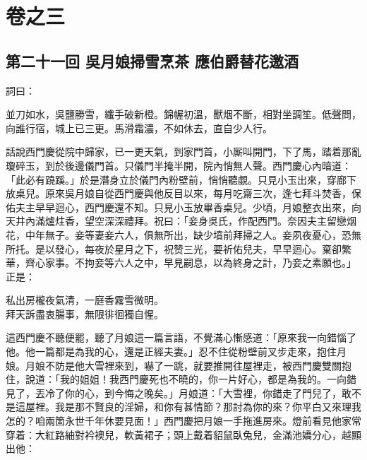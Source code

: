 \part*{{\titlename}卷之三}



\chapter*{第二十一回 吳月娘掃雪烹茶 應伯爵替花邀酒}


詞曰：

\begin{myquote} 
並刀如水，吳鹽勝雪，纖手破新橙。錦幄初溫，獸烟不斷，相對坐調笙。低聲問，向誰行宿，城上已三更。馬滑霜濃，不如休去，直自少人行。

\end{myquote} 

話說西門慶從院中歸家，已一更天氣，到家門首，小厮叫開門，下了馬，踏着那亂瓊碎玉，到於後邊儀門首。只儀門半掩半開，院內悄無人聲。西門慶心內暗道：「此必有蹺蹊。」{}於是潛身立於儀門內粉壁前，悄悄聽覷。只見小玉出來，穿廊下放桌兒。原來吳月娘自從西門慶與他反目以來，{}每月吃齋三次，逢七拜斗焚香，保佑夫主早早迴心，西門慶還不知。只見小玉放畢香桌兒。少頃，月娘整衣出來，向天井內滿爐炷香，望空深深禮拜。祝曰：「妾身吳氏，作配西門。奈因夫主留戀烟花，中年無子。妾等妻妾六人，俱無所出，缺少墳前拜掃之人。妾夙夜憂心，恐無所托。是以發心，每夜於星月之下，祝赞三光，要祈佑兒夫，早早迴心。棄卻繁華，齊心家事。不拘妾等六人之中，早見嗣息，以為終身之計，乃妾之素願也。」{}正是：

\begin{myquote} 
私出房櫳夜氣清，一庭香霧雪微明。\\拜天訴盡衷腸事，無限徘徊獨自惺。
\end{myquote} 

這西門慶不聽便罷，聽了月娘這一篇言語，不覺滿心慚感道：「原來我一向錯惱了他。他一篇都是為我的心，還是正經夫妻。」忍不住從粉壁前叉步走來，抱住月娘。月娘不防是他大雪裡來到，嚇了一跳，就要推開往屋裡走，被西門慶雙關抱住，說道：「我的姐姐！我西門慶死也不曉的，你一片好心，都是為我的。一向錯見了，丟冷了你的心，到今悔之晚矣。」月娘道：「大雪裡，你錯走了門兒了，敢不是這屋裡。我是那不賢良的淫婦，和你有甚情節？那討為你的來？你平白又來理我怎的？咱兩箇永世千年休要見面！」西門慶把月娘一手拖進房來。燈前看見他家常穿着：大紅路紬對衿襖兒，軟黃裙子；頭上戴着貂鼠臥兔兒，金滿池嬌分心，越顯出他：

